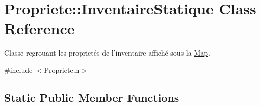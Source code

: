 \hypertarget{classPropriete_1_1InventaireStatique}{\section{Propriete\-:\-:Inventaire\-Statique Class Reference}
\label{classPropriete_1_1InventaireStatique}
}


Classe regrouant les proprietés de l'inventaire affiché sous la \hyperlink{classMap}{Map}.  




{\ttfamily \#include $<$Propriete.\-h$>$}

\subsection*{Static Public Member Functions}
